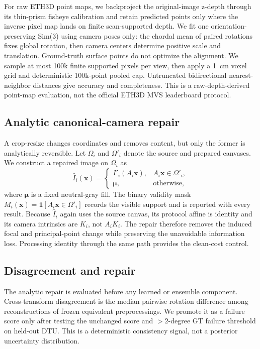 For raw ETH3D point maps, we backproject the original-image z-depth through its
thin-prism fisheye calibration and retain predicted points only where the
inverse pixel map lands on finite scan-supported depth.  We fit one
orientation-preserving Sim(3) using camera poses only: the chordal mean of
paired rotations fixes global rotation, then camera centers determine positive
scale and translation. Ground-truth surface points do not optimize the
alignment.  We sample at most
100k finite supported pixels per view, then apply a \SI{1}{cm} voxel grid and
deterministic 100k-point pooled cap.  Untruncated bidirectional nearest-neighbor
distances give accuracy and completeness.  This is a raw-depth-derived
point-map evaluation, not the official ETH3D MVS leaderboard protocol.

\subsection{Analytic canonical-camera repair}
A crop-resize changes coordinates and removes content, but only the former is
analytically reversible.  Let $\Omega_i$ and $\Omega'_i$ denote the source and
prepared canvases.  We construct a repaired image on $\Omega_i$ as
\begin{equation}
  \widehat I_i(\mathbf{x})=
  \begin{cases}
    I'_i(A_i\mathbf{x}), & A_i\mathbf{x}\in\Omega'_i,\\
    \boldsymbol\mu, & \text{otherwise},
  \end{cases}
  \label{eq:canonical-repair}
\end{equation}
where $\boldsymbol\mu$ is a fixed neutral-gray fill.  The binary validity mask
$M_i(\mathbf{x})=\mathbf{1}[A_i\mathbf{x}\in\Omega'_i]$ records the visible
support and is reported with every result.  Because $\widehat I_i$ again uses
the source canvas, its protocol affine is identity and its camera intrinsics
are $K_i$, not $A_iK_i$.  The repair therefore removes the induced focal and
principal-point change while preserving the unavoidable information loss.
Processing identity through the same path provides the clean-cost control.

\subsection{Disagreement and repair}
The analytic repair is evaluated before any learned or ensemble component.
Cross-transform disagreement is the median pairwise rotation difference among
reconstructions of frozen equivalent preprocessings.  We promote it as a
failure score only after testing the unchanged score and $>\!2$-degree GT
failure threshold on held-out DTU.  This is a deterministic consistency signal,
not a posterior uncertainty distribution.

